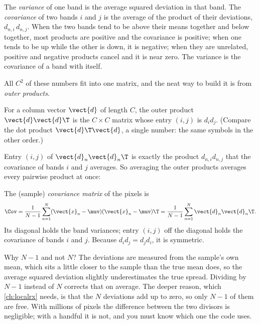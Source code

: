 The \emph{variance} of one band is the average squared deviation in that band.
The \emph{covariance} of two bands $i$ and $j$ is the average of the product of
their deviations, $d_{n,i}\,d_{n,j}$. When the two bands tend to be above their means together and
below together, most products are positive and the covariance is positive; when one tends to be
up while the other is down, it is negative; when they are unrelated, positive and negative
products cancel and it is near zero. The variance is the covariance of a band with itself.

All $C^2$ of these numbers fit into one matrix, and the neat way to build it is from
\emph{outer products}.

\begin{definition}
For a column vector $\vect{d}$ of length $C$, the outer product $\vect{d}\vect{d}\T$ is the
$C \times C$ matrix whose entry $(i,j)$ is $d_i d_j$. (Compare the dot product $\vect{d}\T\vect{d}$,
a single number: the same symbols in the other order.)
\end{definition}

Entry $(i,j)$ of $\vect{d}_n\vect{d}_n\T$ is exactly the product $d_{n,i}d_{n,j}$ that the
covariance of bands $i$ and $j$ averages. So averaging the outer products averages every
pairwise product at once:

\begin{definition}
The (sample) \emph{covariance matrix} of the pixels is
\begin{equation}\label{eq:linalg:cov}
\Cov = \frac{1}{N-1}\sum_{n=1}^{N} (\vect{x}_n - \muv)(\vect{x}_n - \muv)\T
     = \frac{1}{N-1}\sum_{n=1}^{N} \vect{d}_n\vect{d}_n\T .
\end{equation}
Its diagonal holds the band variances; entry $(i,j)$ off the diagonal holds the covariance of
bands $i$ and $j$. Because $d_i d_j = d_j d_i$, it is symmetric.
\end{definition}

Why $N-1$ and not $N$? The deviations are measured from the sample's own mean, which sits a
little closer to the sample than the true mean does, so the average squared deviation slightly
underestimates the true spread. Dividing by $N-1$ instead of $N$ corrects that on average. The
deeper reason, which \cref{ch:localrx} needs, is that the $N$ deviations add up to zero, so only
$N-1$ of them are free. With millions of pixels the difference between the two divisors is
negligible; with a handful it is not, and you must know which one the code uses.

